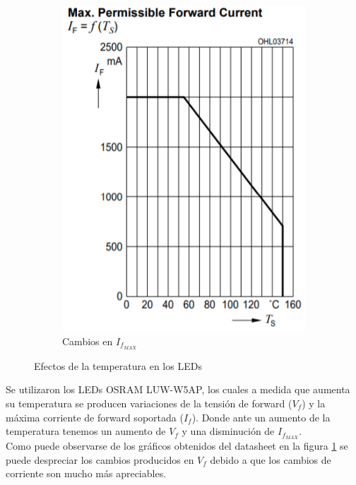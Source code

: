 \documentclass[e4-tp2-main.tex]{subfiles}
\begin{document}
\begin{figure}
\begin{subfigure}[t]{0.25\textwidth}
    	\includegraphics[width=\textwidth]{images/ej2/Cambio_If_LED.png}
    	\caption{Cambios en $I_{f_{MAX}}$}
    \end{subfigure}
    \caption{Efectos de la temperatura en los LEDs}
    \label{fig:Efec_Leds}
\end{figure}

Se utilizaron los LEDs OSRAM LUW-W5AP, los cuales a medida que aumenta su temperatura se producen variaciones de la tensión de forward ($V_f$) y la máxima corriente de forward soportada ($I_f$). Donde ante un aumento de la temperatura tenemos un aumento de $V_f$ y una disminución de $I_{f_{MAX}}$.\\

Como puede observarse de los gráficos obtenidos del datasheet en la figura \ref{fig:Efec_Leds} se puede despreciar los cambios producidos en $V_f$ debido a que los cambios de corriente son mucho más apreciables.\\
\end{document}
